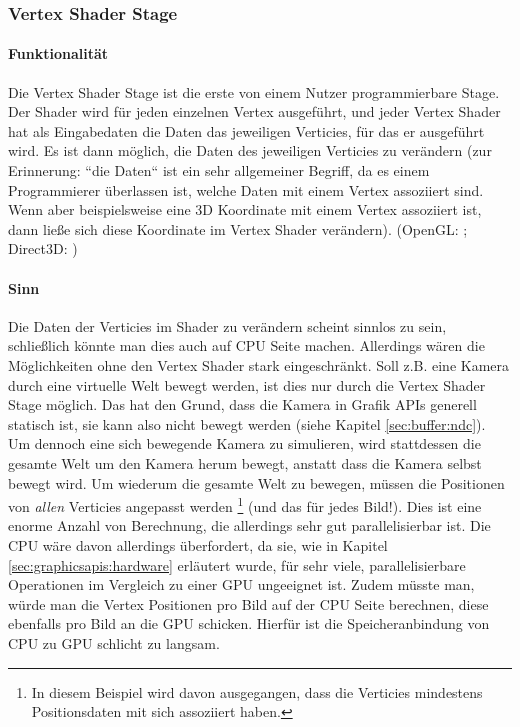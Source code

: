 \subsubsection{Vertex Shader Stage}
\paragraph{Funktionalität}
Die Vertex Shader Stage ist die erste von einem Nutzer programmierbare Stage. Der Shader wird für jeden einzelnen Vertex ausgeführt, und jeder Vertex Shader hat als Eingabedaten die Daten das jeweiligen Verticies, für das er ausgeführt wird. Es ist dann möglich, die Daten des jeweiligen Verticies zu verändern (zur Erinnerung: ``die Daten`` ist ein sehr allgemeiner Begriff, da es einem Programmierer überlassen ist, welche Daten mit einem Vertex assoziiert sind. Wenn aber beispielsweise eine 3D Koordinate mit einem Vertex assoziiert ist, dann ließe sich diese Koordinate im Vertex Shader verändern). (OpenGL: \cite{stage_gl_vertex_spec}; Direct3D: \cite{stage_d3d_vertex_shader})

\paragraph{Sinn}
Die Daten der Verticies im Shader zu verändern scheint sinnlos zu sein, schließlich könnte man dies auch auf CPU Seite machen. Allerdings wären die Möglichkeiten ohne den Vertex Shader stark eingeschränkt. Soll z.B. eine Kamera durch eine virtuelle Welt bewegt werden, ist dies nur durch die Vertex Shader Stage möglich. Das hat den Grund, dass die Kamera in Grafik APIs generell statisch ist, sie kann also nicht bewegt werden (siehe Kapitel \ref{sec:buffer:ndc}). Um dennoch eine sich bewegende Kamera zu simulieren, wird stattdessen die gesamte Welt um den Kamera herum bewegt, anstatt dass die Kamera selbst bewegt wird. Um wiederum die gesamte Welt zu bewegen, müssen die Positionen von \textit{allen} Verticies angepasst werden \footnote{In diesem Beispiel wird davon ausgegangen, dass die Verticies mindestens Positionsdaten mit sich assoziiert haben.} (und das für jedes Bild!). Dies ist eine enorme Anzahl von Berechnung, die allerdings sehr gut parallelisierbar ist. Die CPU wäre davon allerdings überfordert, da sie, wie in Kapitel \ref{sec:graphicsapis:hardware} erläutert wurde, für sehr viele, parallelisierbare Operationen im Vergleich zu einer GPU ungeeignet ist. Zudem müsste man, würde man die Vertex Positionen pro Bild auf der CPU Seite berechnen, diese ebenfalls pro Bild an die GPU schicken. Hierfür ist die Speicheranbindung von CPU zu GPU schlicht zu langsam.


